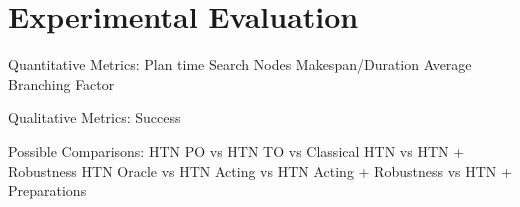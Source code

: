 \section{Experimental Evaluation}\label{sec:evaluation}

Quantitative Metrics:
Plan time
Search Nodes
Makespan/Duration
Average Branching Factor

Qualitative Metrics:
Success

Possible Comparisons:
HTN PO vs HTN TO vs Classical \citep{yuxinliuPlanningOvercookedGame2020}
HTN vs HTN + Robustness
HTN Oracle vs HTN Acting vs HTN Acting + Robustness vs HTN + Preparations